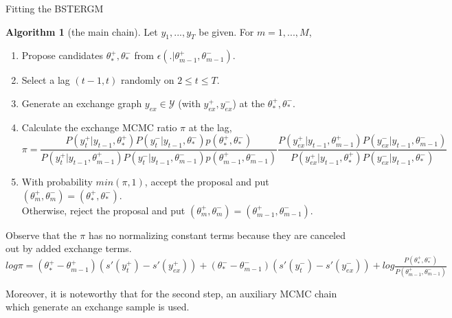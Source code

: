 \documentclass[aspectratio=169,ignorenonframetext,9pt]{beamer}
\theoremstyle{plain}
\theoremstyle{definition}
\newtheorem{algo}{Algorithm}[section]
\begin{document}
\begin{frame}{Fitting the BSTERGM}
    \begin{algo}[the main chain]
    Let $y_1,...,y_T$ be given. For $m=1,...,M$,
    \begin{enumerate}
        \item Propose candidates $\theta_*^+,\theta_*^-$ from $\epsilon(.|\theta_{m-1}^+,\theta_{m-1}^-)$.
        \item Select a lag $(t-1,t)$ randomly on $2 \leq t \leq T$.
        \item Generate an exchange graph $y_{ex} \in\mathcal{Y}$ (with $y_{ex}^+, y_{ex}^-$) at the $\theta_*^+,\theta_*^-$.
        \item Calculate the exchange MCMC ratio $\pi$ at the lag,
            \[\pi = \frac{P(y_t^+|y_{t-1},\theta_*^+)P(y_t^-|y_{t-1},\theta_*^-)p(\theta_*^+,\theta_*^-)}
                {P(y_t^+|y_{t-1},\theta_{m-1}^+)P(y_t^-|y_{t-1},\theta_{m-1}^-)p(\theta_{m-1}^+,\theta_{m-1}^-)}
                \frac{P(y_{ex}^+|y_{t-1},\theta_{m-1}^+)P(y_{ex}^-|y_{t-1},\theta_{m-1}^-)}{P(y_{ex}^+|y_{t-1},\theta_*^+)P(y_{ex}^-|y_{t-1},\theta_*^-)}\]
        \item With probability $min(\pi,1)$, accept the proposal and put $(\theta_m^+,\theta_m^-) = (\theta_*^+,\theta_*^-)$.\\
            Otherwise, reject the proposal and put $(\theta_m^+,\theta_m^-) = (\theta_{m-1}^+,\theta_{m-1}^-)$.
    \end{enumerate}
    \end{algo}    
    Observe that the $\pi$ has no normalizing constant terms because they are canceled out by added exchange terms.
    \(log\pi = (\theta_*^+-\theta_{m-1}^+)(s'(y_{t}^+)-s'(y_{ex}^+))
    +(\theta_*^- -\theta_{m-1}^-)(s'(y_{t}^-)-s'(y_{ex}^-))+log \frac{P(\theta_*^+,\theta_*^-)}{P(\theta_{m-1}^+,\theta_{m-1}^-)}\)
    
    Moreover, it is noteworthy that for the second step, an auxiliary MCMC chain which generate an exchange sample is used.
\end{frame}
\end{document}
